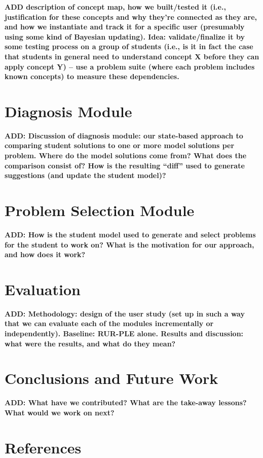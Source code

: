 \documentclass[twocolumn]{article}
\newcommand{\fix}[1]{{\bf #1}}
\begin{document}
\fix{ADD description of concept map, how we built/tested it 
(i.e., justification for these concepts and why they're
connected as they are, and how we instantiate and track it for a
specific user (presumably using some kind of Bayesian updating).  
Idea:  validate/finalize it by some testing process on
a group of students (i.e., is it in fact the case that students in
general need to understand concept X before they can apply concept Y)
-- use a problem suite (where each problem includes known concepts)
to measure these dependencies.} 


\section{Diagnosis Module}
\label{sec:diagnosis}

\fix{ADD:  Discussion of diagnosis module:  our state-based
approach to comparing student solutions to one or more model
solutions per problem.  Where do the model solutions come from?
What does the comparison consist of?  How is the resulting
``diff'' used to generate suggestions (and update the student model)?}


\section{Problem Selection Module}
\label{sec:prob-selection}

\fix{ADD: How is the student model used to generate and select
  problems for the student to work on?  What is the motivation for our
  approach, and how does it work?}


\section{Evaluation}
\label{sec:evaluation}

\fix{ADD:  Methodology:  design of the user study (set up in such a
  way that we can evaluate each of the modules incrementally or
  independently).  Baseline:  RUR-PLE alone.  Results and 
  discussion:  what were the results, and what do they mean?}


\section{Conclusions and Future Work}
\label{conclusions}

\fix{ADD:  What have we contributed?  What are the take-away lessons?
  What would we work on next?}

\section*{References}
\end{document}
